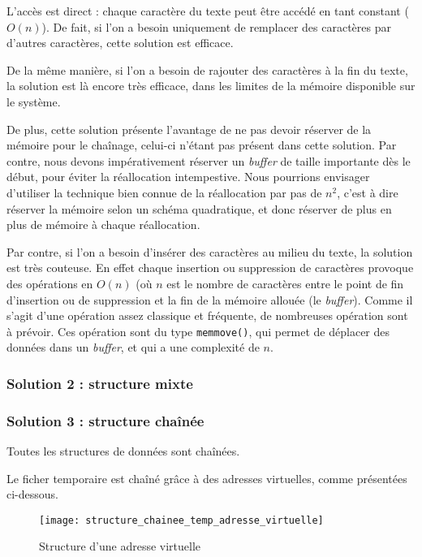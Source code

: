 L'accès est direct : chaque caractère du texte peut être accédé en tant
constant ($O(n)$). De fait, si l'on a besoin uniquement de remplacer des
caractères par d'autres caractères, cette solution est efficace.

De la même manière, si l'on a besoin de rajouter des caractères à la fin du
texte, la solution est là encore très efficace, dans les limites de la mémoire
disponible sur le système.

De plus, cette solution présente l'avantage de ne pas devoir réserver de la
mémoire pour le chaînage, celui-ci n'étant pas présent dans cette solution.
Par contre, nous devons impérativement réserver un \emph{buffer} de taille
importante dès le début, pour éviter la réallocation intempestive. Nous
pourrions envisager d'utiliser la technique bien connue de la réallocation par
pas de $n^2$, c'est à dire réserver la mémoire selon un schéma quadratique, et
donc réserver de plus en plus de mémoire à chaque réallocation.

Par contre, si l'on a besoin d'insérer des caractères au milieu du texte, la
solution est très couteuse. En effet chaque insertion ou suppression de
caractères provoque des opérations en $O(n)$ (où $n$ est le nombre de
caractères entre le point de fin d'insertion ou de suppression et la fin de la
mémoire allouée (le \emph{buffer}). Comme il s'agit d'une opération assez
classique et fréquente, de nombreuses opération sont à prévoir.  Ces opération
sont du type \texttt{memmove()}, qui permet de déplacer des données dans un
\emph{buffer}, et qui a une complexité de $n$.

\subsubsection{Solution 2 : structure mixte}

\subsubsection{Solution 3 : structure chaînée}
Toutes les structures de données sont chaînées.

Le ficher temporaire est chaîné grâce à des adresses virtuelles, comme présentées ci-dessous.

\begin{figure}[H]
	\centering
	\caption{Structure d'une adresse virtuelle}
	\texttt{[image: structure\_chainee\_temp\_adresse\_virtuelle]}
\end{figure}

